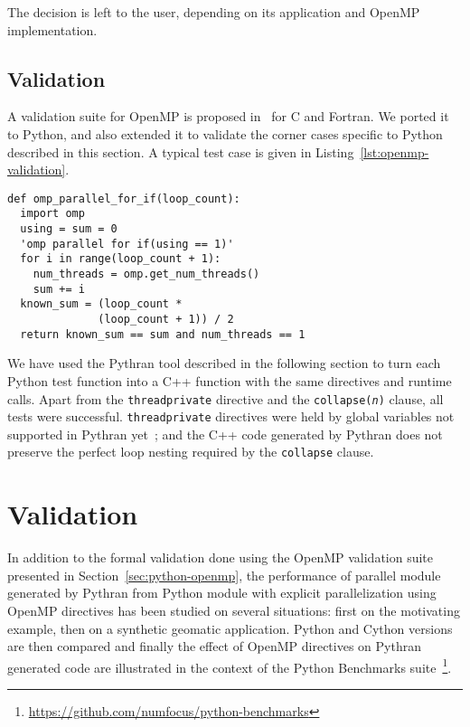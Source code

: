 \documentclass[conference]{IEEEtran}
\begin{document}
The decision is left to the user, depending on its application and OpenMP
implementation.

\subsection{Validation}

A validation suite for OpenMP is proposed in~\cite{wang2012} for C and Fortran.
We ported it to Python, and also extended it to validate the corner cases
specific to Python described in this section. A typical test case is given in
Listing~\ref{lst:openmp-validation}.

\begin{lstlisting}[float,label={lst:openmp-validation},caption={Example of Python
    OpenMP validation test case.}]
def omp_parallel_for_if(loop_count):
  import omp
  using = sum = 0
  'omp parallel for if(using == 1)'
  for i in range(loop_count + 1):
    num_threads = omp.get_num_threads()
    sum += i
  known_sum = (loop_count *
              (loop_count + 1)) / 2
  return known_sum == sum and num_threads == 1
\end{lstlisting}

We have used the Pythran tool described in the following section to turn each
Python test function into a C++ function with the same directives and runtime
calls. Apart from the \texttt{threadprivate} directive and the
\texttt{collapse(\emph{n})} clause, all tests were successful.
\texttt{threadprivate} directives were held by global variables not supported in
Pythran yet~; and the C++ code generated by Pythran does not preserve the perfect
loop nesting required by the \texttt{collapse} clause.

\section{Validation}\label{sec:validation}

In addition to the formal validation done using the OpenMP validation suite
presented in Section~\ref{sec:python-openmp}, the performance of parallel module
generated by Pythran from Python module with explicit parallelization using
OpenMP directives has been studied on several situations: first on the
motivating example, then on a synthetic geomatic application. Python and Cython
versions are then compared and finally the effect of OpenMP directives on Pythran
generated code are illustrated in the context of the Python Benchmarks
suite~\footnote{\url{https://github.com/numfocus/python-benchmarks}}.
\end{document}
